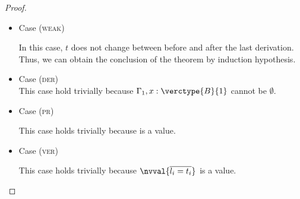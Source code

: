 \begin{proof}
\begin{itemize}
\item Case (\textsc{weak})
\begin{center}
    \begin{minipage}{.34\linewidth}
    \end{minipage}
\end{center}
In this case, $t$ does not change between before and after the last derivation.
Thus, we can obtain the conclusion of the theorem by induction hypothesis.
\\

\item Case (\textsc{der})\\
This case hold trivially because $\Gamma_1, x:\verctype{B}{1}$ cannot be $\emptyset$.
\\

\item Case (\textsc{pr})
\begin{center}
    \begin{minipage}{.29\linewidth}
    \end{minipage}
\end{center}
This case holds trivially because  is a value.
\\

\item Case (\textsc{ver})
\begin{center}
    \begin{minipage}{.52\linewidth}
    \end{minipage}
\end{center}
This case holds trivially because $\nvval{\overline{l_i=t_i}}$ is a value.
\\


\end{itemize}
\end{proof}
